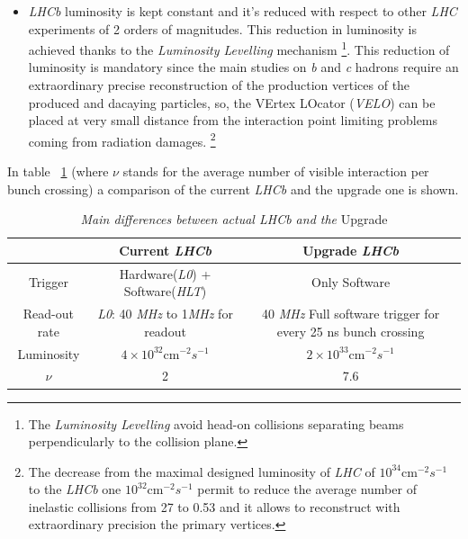 \documentclass[paper=a4, fontsize=10pt]{scrartcl}
\numberwithin{equation}{section}		%
\numberwithin{figure}{section}			%
\numberwithin{table}{section}				%
\begin{document}
\begin{itemize}
\item{\textit{LHCb} luminosity is kept constant and it's reduced with respect to other \textit{LHC} experiments of 2 orders of magnitudes. This reduction in luminosity is achieved thanks to the \textit{Luminosity Levelling} mechanism \footnote{The \textit{Luminosity Levelling} avoid head-on collisions separating beams perpendicularly to the collision plane.}.
This reduction of luminosity is mandatory since the main studies on \textit{b} and \textit{c} hadrons require an extraordinary precise reconstruction of the production vertices of the produced and dacaying particles, so, the VErtex LOcator (\textit{VELO}) can be placed at very small distance from the interaction point limiting problems coming from radiation damages. \footnote{The decrease from the maximal designed luminosity of \textit{LHC} of $10^{34}$cm$^{-2}s^{-1}$ to the \textit{LHCb} one  $10^{32}$cm$^{-2}s^{-1}$ permit to reduce the average number of inelastic collisions from 27 to 0.53 and it allows to reconstruct with extraordinary precision the primary vertices.}}
\end{itemize}

In table ~\ref{table:runningCondition} (where $\nu$ stands for the average number of visible interaction per bunch crossing) a comparison of the current \textit{LHCb} and the upgrade one is shown.

\begin{table}[h]
\centering
\begin{tabular}{|c|c|c|}
\hline
           & \textbf{Current \textit{LHCb}}          & \textbf{Upgrade \textit{LHCb}} \\ \hline
Trigger    & Hardware(\textit{L0}) + Software(\textit{HLT}) & Only Software \\ \hline
Read-out rate & \textit{L0}: 40 \textit{MHz} to 1\textit{MHz} for readout & 40 \textit{MHz} Full software trigger for every 25 ns bunch crossing \\ \hline
Luminosity & $4 \times 10 ^{32}$cm$^{-2}s^{-1}$ & $2\times 10^{33}$cm$^{-2}s^{-1}$ \\ \hline
$\nu $ & 2 & 7.6 \\ \hline

\end{tabular}
\caption{\textit{Main differences between actual LHCb and the} Upgrade}\label{table:runningCondition}
\end{table}
\end{document}
